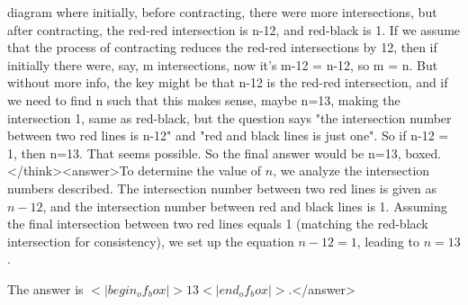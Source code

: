 diagram where initially, before contracting, there were more intersections, but after contracting, the red-red intersection is n-12, and red-black is 1. If we assume that the process of contracting reduces the red-red intersections by 12, then if initially there were, say, m intersections, now it's m-12 = n-12, so m = n. But without more info, the key might be that n-12 is the red-red intersection, and if we need to find n such that this makes sense, maybe n=13, making the intersection 1, same as red-black, but the question says "the intersection number between two red lines is n-12" and "red and black lines is just one". So if n-12 = 1, then n=13. That seems possible. So the final answer would be n=13, boxed.</think><answer>To determine the value of \( n \), we analyze the intersection numbers described. The intersection number between two red lines is given as \( n - 12 \), and the intersection number between red and black lines is 1. Assuming the final intersection between two red lines equals 1 (matching the red-black intersection for consistency), we set up the equation \( n - 12 = 1 \), leading to \( n = 13 \).

The answer is \(<|begin_of_box|>13<|end_of_box|>\).</answer>